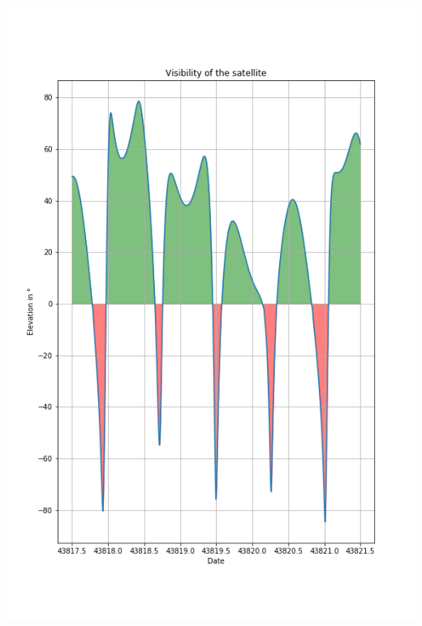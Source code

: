 \documentclass[a4paper,12pt,calibri,oneside,openany]{book}
\theoremstyle{break}
\begin{document}
\begin{center}
	\includegraphics[width=\linewidth]{elevation}
\end{center}
\appendix






	




%

%

\end{document}
